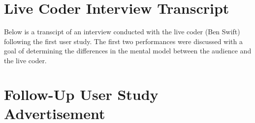 \begin{center}
\end{center}

\chapter{Live Coder Interview Transcript}
\label{appendix:live-coder-interview-transcript}

Below is a transcipt of an interview conducted with the live coder (Ben Swift) following the first user study. The first two performances were discussed with a goal of determining the differences in the mental model between the audience and the live coder.



\chapter{Follow-Up User Study Advertisement}
\label{appendix:follow-up-user-study-advertisement}

